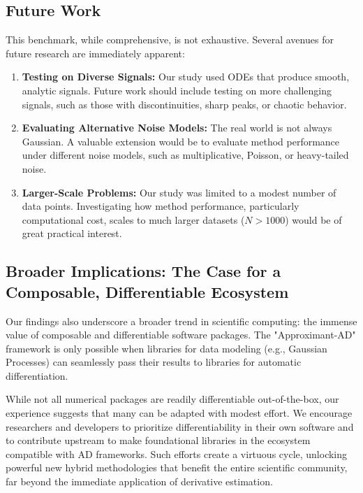 \subsection{Future Work}

This benchmark, while comprehensive, is not exhaustive. Several avenues for future research are immediately apparent:

\begin{enumerate}
    \item \textbf{Testing on Diverse Signals:} Our study used ODEs that produce smooth, analytic signals. Future work should include testing on more challenging signals, such as those with discontinuities, sharp peaks, or chaotic behavior.
    \item \textbf{Evaluating Alternative Noise Models:} The real world is not always Gaussian. A valuable extension would be to evaluate method performance under different noise models, such as multiplicative, Poisson, or heavy-tailed noise.
    \item \textbf{Larger-Scale Problems:} Our study was limited to a modest number of data points. Investigating how method performance, particularly computational cost, scales to much larger datasets ($N > 1000$) would be of great practical interest.
\end{enumerate}

\subsection{Broader Implications: The Case for a Composable, Differentiable Ecosystem}

Our findings also underscore a broader trend in scientific computing: the immense value of composable and differentiable software packages. The "Approximant-AD" framework is only possible when libraries for data modeling (e.g., Gaussian Processes) can seamlessly pass their results to libraries for automatic differentiation.

While not all numerical packages are readily differentiable out-of-the-box, our experience suggests that many can be adapted with modest effort. We encourage researchers and developers to prioritize differentiability in their own software and to contribute upstream to make foundational libraries in the ecosystem compatible with AD frameworks. Such efforts create a virtuous cycle, unlocking powerful new hybrid methodologies that benefit the entire scientific community, far beyond the immediate application of derivative estimation.
